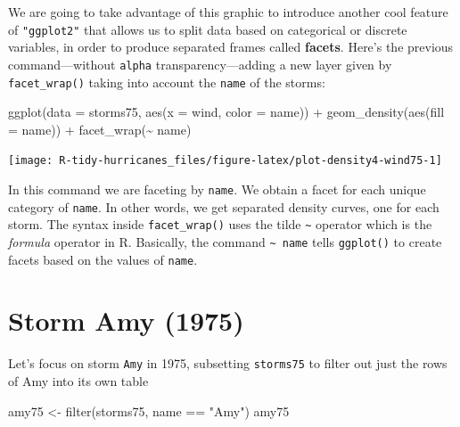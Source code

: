 \documentclass[
]{book}
\newenvironment{Shaded}{\begin{snugshade}}{\end{snugshade}}
\newcommand{\AttributeTok}[1]{\textcolor[rgb]{0.77,0.63,0.00}{#1}}
\newcommand{\FunctionTok}[1]{\textcolor[rgb]{0.00,0.00,0.00}{#1}}
\newcommand{\NormalTok}[1]{#1}
\newcommand{\OtherTok}[1]{\textcolor[rgb]{0.56,0.35,0.01}{#1}}
\newcommand{\SpecialCharTok}[1]{\textcolor[rgb]{0.00,0.00,0.00}{#1}}
\newcommand{\StringTok}[1]{\textcolor[rgb]{0.31,0.60,0.02}{#1}}
\begin{document}
We are going to take advantage of this graphic to introduce another cool
feature of \texttt{"ggplot2"} that allows us to split data based on categorical or
discrete variables, in order to produce separated frames called \textbf{facets}.
Here's the previous command---without \texttt{alpha} transparency---adding a
new layer given by \texttt{facet\_wrap()} taking into account the \texttt{name} of the
storms:

\begin{Shaded}
\begin{Highlighting}[]
\FunctionTok{ggplot}\NormalTok{(}\AttributeTok{data =}\NormalTok{ storms75, }\FunctionTok{aes}\NormalTok{(}\AttributeTok{x =}\NormalTok{ wind, }\AttributeTok{color =}\NormalTok{ name)) }\SpecialCharTok{+}
  \FunctionTok{geom\_density}\NormalTok{(}\FunctionTok{aes}\NormalTok{(}\AttributeTok{fill =}\NormalTok{ name)) }\SpecialCharTok{+} 
  \FunctionTok{facet\_wrap}\NormalTok{(}\SpecialCharTok{\textasciitilde{}}\NormalTok{ name)}
\end{Highlighting}
\end{Shaded}

\begin{center}\texttt{[image: R-tidy-hurricanes\_files/figure-latex/plot-density4-wind75-1]} \end{center}

In this command we are faceting by \texttt{name}. We obtain a facet for each unique
category of \texttt{name}. In other words, we get separated density curves, one for
each storm. The syntax inside \texttt{facet\_wrap()} uses the tilde \texttt{\textasciitilde{}} operator which
is the \emph{formula} operator in R. Basically, the command \texttt{\textasciitilde{}\ name} tells
\texttt{ggplot()} to create facets based on the values of \texttt{name}.

\hypertarget{storm-amy-1975}{%
\chapter{Storm Amy (1975)}\label{storm-amy-1975}}

Let's focus on storm \texttt{Amy} in 1975, subsetting \texttt{storms75} to filter out just
the rows of Amy into its own table

\begin{Shaded}
\begin{Highlighting}[]
\NormalTok{amy75 }\OtherTok{\textless{}{-}} \FunctionTok{filter}\NormalTok{(storms75, name }\SpecialCharTok{==} \StringTok{"Amy"}\NormalTok{)}
\NormalTok{amy75}
\end{Highlighting}
\end{Shaded}
\end{document}
